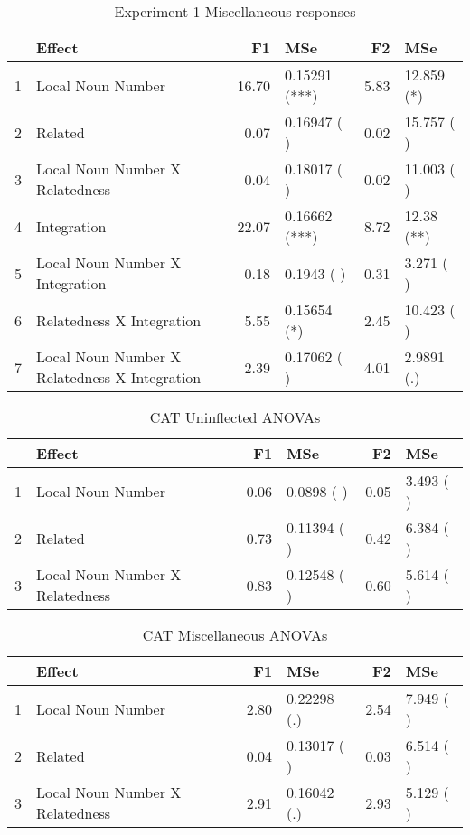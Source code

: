 \documentclass[a4paper,11pt]{article}\usepackage[]{graphicx}\usepackage[]{color}
\begin{document}
\begin{table}[ht]
\centering
\begin{tabular}{rlrlrl}
  \hline
 & Effect & F1 & MSe & F2 & MSe \\ 
  \hline
1 & Local Noun Number & 16.70 & 0.15291 (***) & 5.83 & 12.859 (*) \\ 
  2 & Related & 0.07 & 0.16947 ( ) & 0.02 & 15.757 ( ) \\ 
  3 & Local Noun Number X Relatedness & 0.04 & 0.18017 ( ) & 0.02 & 11.003 ( ) \\ 
  4 & Integration & 22.07 & 0.16662 (***) & 8.72 & 12.38 (**) \\ 
  5 & Local Noun Number X Integration & 0.18 & 0.1943 ( ) & 0.31 & 3.271 ( ) \\ 
  6 & Relatedness X Integration & 5.55 & 0.15654 (*) & 2.45 & 10.423 ( ) \\ 
  7 & Local Noun Number X Relatedness X Integration & 2.39 & 0.17062 ( ) & 4.01 & 2.9891 (.) \\ 
   \hline
\end{tabular}
\caption[Exp. 1 Miscellaneous]{Experiment 1 Miscellaneous responses} 
\end{table}


\begin{table}[ht]
\centering
\begin{tabular}{rlrlrl}
  \hline
 & Effect & F1 & MSe & F2 & MSe \\ 
  \hline
1 & Local Noun Number & 0.06 & 0.0898 ( ) & 0.05 & 3.493 ( ) \\ 
  2 & Related & 0.73 & 0.11394 ( ) & 0.42 & 6.384 ( ) \\ 
  3 & Local Noun Number X Relatedness & 0.83 & 0.12548 ( ) & 0.60 & 5.614 ( ) \\ 
   \hline
\end{tabular}
\caption[CAT Uninflected ANOVAs]{CAT Uninflected ANOVAs} 
\end{table}


\begin{table}[ht]
\centering
\begin{tabular}{rlrlrl}
  \hline
 & Effect & F1 & MSe & F2 & MSe \\ 
  \hline
1 & Local Noun Number & 2.80 & 0.22298 (.) & 2.54 & 7.949 ( ) \\ 
  2 & Related & 0.04 & 0.13017 ( ) & 0.03 & 6.514 ( ) \\ 
  3 & Local Noun Number X Relatedness & 2.91 & 0.16042 (.) & 2.93 & 5.129 ( ) \\ 
   \hline
\end{tabular}
\caption[CAT Miscellaneous ANOVAs]{CAT Miscellaneous ANOVAs} 
\end{table}
\end{document}
